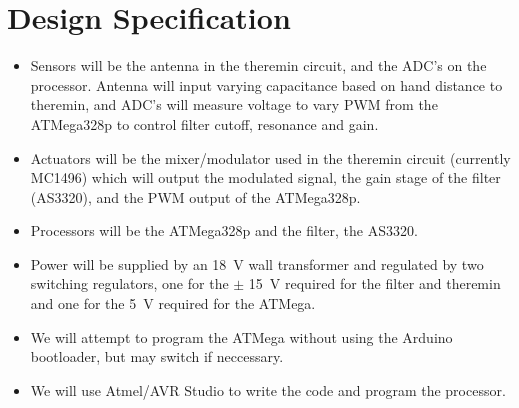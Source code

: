 \documentclass[11pt]{report}
\begin{document}
\section*{Design Specification}
\begin{itemize}
	\item Sensors will be the antenna in the theremin circuit, and the ADC's on the processor. Antenna will input varying capacitance based on hand distance to theremin, and ADC's will measure voltage to vary PWM from the ATMega328p to control filter cutoff, resonance and gain.
	\item Actuators will be the mixer/modulator used in the theremin circuit (currently MC1496) which will output the modulated signal, the gain stage of the filter (AS3320), and the PWM output of the ATMega328p.
	\item Processors will be the ATMega328p and the filter, the AS3320.
	\item Power will be supplied by an \SI{18}{\volt} wall transformer and regulated by two switching regulators, one for the $\pm$ \SI{15}{\volt} required for the filter and theremin and one for the \SI{5}{\volt} required for the ATMega.
	\item We will attempt to program the ATMega without using the Arduino bootloader, but may switch if neccessary. 
	\item We will use Atmel/AVR Studio to write the code and program the processor.
\end{itemize}
\end{document}
